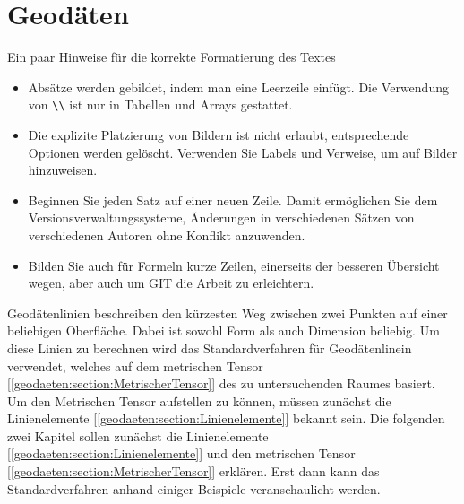 %
%
%
%
\chapter{Geodäten\label{chapter:geodaeten}}
\begin{refsection}

Ein paar Hinweise für die korrekte Formatierung des Textes
\begin{itemize}
\item
Absätze werden gebildet, indem man eine Leerzeile einfügt.
Die Verwendung von \verb+\\+ ist nur in Tabellen und Arrays gestattet.
\item
Die explizite Platzierung von Bildern ist nicht erlaubt, entsprechende
Optionen werden gelöscht. 
Verwenden Sie Labels und Verweise, um auf Bilder hinzuweisen.
\item
Beginnen Sie jeden Satz auf einer neuen Zeile. 
Damit ermöglichen Sie dem Versionsverwaltungssysteme, Änderungen
in verschiedenen Sätzen von verschiedenen Autoren ohne Konflikt 
anzuwenden.
\item 
Bilden Sie auch für Formeln kurze Zeilen, einerseits der besseren
Übersicht wegen, aber auch um GIT die Arbeit zu erleichtern.
\end{itemize}
Geodätenlinien beschreiben den kürzesten Weg zwischen zwei Punkten auf einer beliebigen Oberfläche.
Dabei ist sowohl Form als auch Dimension beliebig.
Um diese Linien zu berechnen wird das Standardverfahren für Geodätenlinein verwendet, welches auf dem metrischen Tensor [\ref{geodaeten:section:MetrischerTensor}] des zu untersuchenden Raumes basiert.
Um den Metrischen Tensor aufstellen zu können, müssen zunächst die Linienelemente [\ref{geodaeten:section:Linienelemente}] bekannt sein.
Die folgenden zwei Kapitel sollen zunächst die Linienelemente [\ref{geodaeten:section:Linienelemente}] und den metrischen Tensor [\ref{geodaeten:section:MetrischerTensor}] erklären.
Erst dann kann das Standardverfahren anhand einiger Beispiele veranschaulicht werden.





\printbibliography[heading=subbibliography]
\end{refsection}

